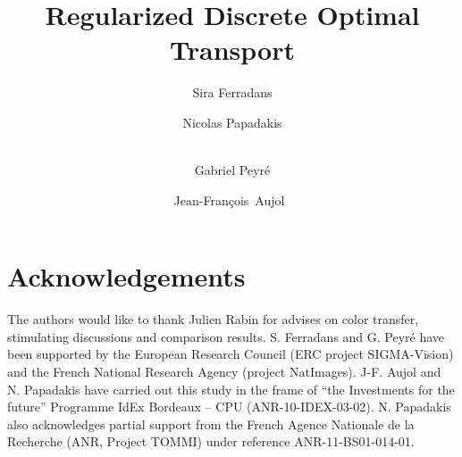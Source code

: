 \documentclass[final]{siamltex}
\title{Regularized Discrete Optimal Transport}
\author{Sira Ferradans\footnotemark[1] 
		\and
		Nicolas Papadakis\footnotemark[2]	
		\and~\\ 
        Gabriel Peyr\'e\footnotemark[1] 
        \and 
        Jean-Fran\c{c}ois~Aujol\footnotemark[2] \ \footnotemark[3]
        }
\begin{document}
\maketitle


\renewcommand{\thefootnote}{\fnsymbol{footnote}}













\section*{Acknowledgements}
The authors would like to thank Julien Rabin for advises on color transfer, stimulating discussions and comparison results. 
S. Ferradans and G. Peyr\'e have been supported by the European Research Council (ERC project SIGMA-Vision) and the French National Research Agency (project NatImages).
 J-F. Aujol and N. Papadakis have carried out this study in the frame of “the Investments for the future” Programme IdEx Bordeaux – CPU (ANR-10-IDEX-03-02).
N. Papadakis also acknowledges partial support from the French Agence Nationale de la Recherche (ANR, Project TOMMI) under reference ANR-11-BS01-014-01.




\end{document}

